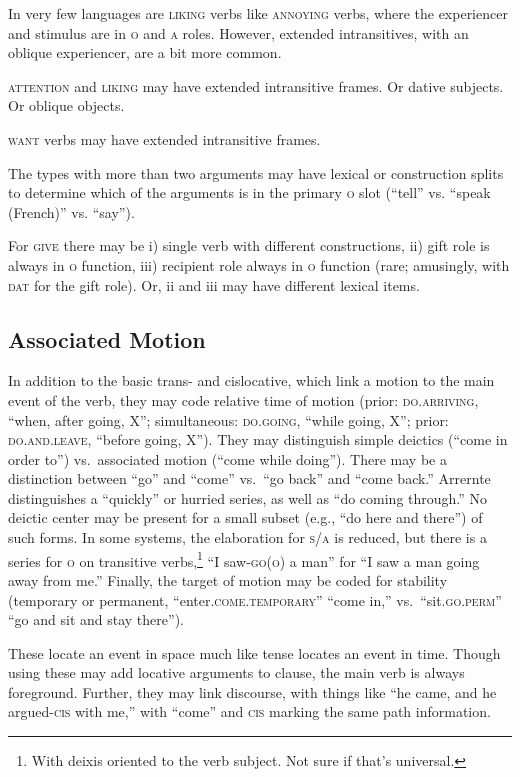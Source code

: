 \documentclass[11pt]{article}
\newcommand{\I}[1]{\textsc{#1}}   %
\begin{document}
In very few languages are \I{liking} verbs like \I{annoying} verbs,
where the experiencer and stimulus are in \I{o} and \I{a} roles.
However, extended intransitives, with an oblique experiencer, are a
bit more common.

\I{attention} and \I{liking} may have extended intransitive frames.
Or dative subjects.  Or oblique objects.

\I{want} verbs may have extended intransitive frames.

The types with more than two arguments may have lexical or
construction splits to determine which of the arguments is in the
primary \I{o} slot (``tell'' vs. ``speak (French)'' vs. ``say'').

For \I{give} there may be i) single verb with different constructions,
ii) gift role is always in \I{o} function, iii) recipient role always
in \I{o} function (rare; amusingly, with \I{dat} for the gift role).
Or, ii and iii may have different lexical items.


\subsection{Associated Motion}
In addition to the basic trans- and cislocative, which link a motion
to the main event of the verb, they may code relative time of motion
(prior: \I{do.arriving}, ``when, after going, X''; simultaneous:
\I{do.going}, ``while going, X''; prior: \I{do.and.leave}, ``before
going, X''). They may distinguish simple deictics (``come in order
to'') vs.\ associated motion (``come while doing'').  There may be a
distinction between ``go'' and ``come'' vs.\ ``go back'' and ``come
back.''  Arrernte distinguishes a ``quickly'' or hurried series, as
well as ``do coming through.''  No deictic center may be present for a
small subset (e.g., ``do here and there'') of such forms.  In some
systems, the elaboration for \I{s/a} is reduced, but there is a series
for \I{o} on transitive verbs,\footnote{With deixis oriented to the
verb subject.  Not sure if that's universal.} ``I saw-\I{go(o)} a
man'' for ``I saw a man going away from me.''  Finally, the target of
motion may be coded for stability (temporary or permanent,
``enter.\I{come.temporary}'' ``come in,'' vs.\ ``sit.\I{go.perm}''
``go and sit and stay there'').

These locate an event in space much like tense locates an event in
time.  Though using these may add locative arguments to clause, the
main verb is always foreground.  Further, they may link discourse,
with things like ``he came, and he argued-\I{cis} with me,'' with
``come'' and \I{cis} marking the same path information.
\end{document}
